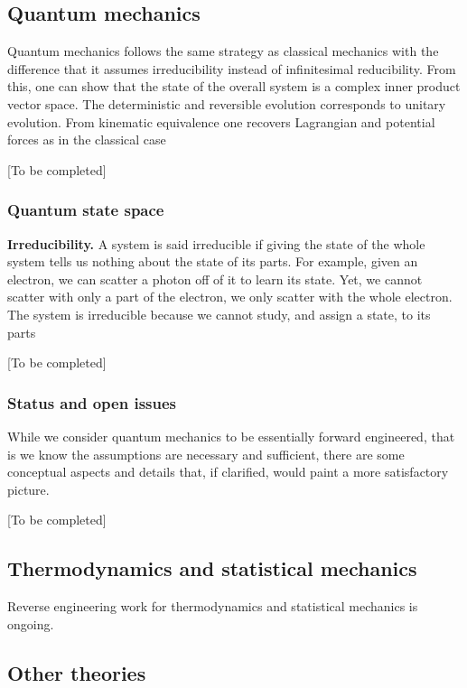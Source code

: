 \documentclass[twocolumn]{article}
\begin{document}
\subsection{Quantum mechanics}

Quantum mechanics follows the same strategy as classical mechanics with the difference that it assumes irreducibility instead of infinitesimal reducibility. From this, one can show that the state of the overall system is a complex inner product vector space. The deterministic and reversible evolution corresponds to unitary evolution. From kinematic equivalence one recovers Lagrangian and potential forces as in the classical case

[To be completed]

\subsubsection{Quantum state space}

\textbf{Irreducibility.} A system is said irreducible if giving the state of the whole system tells us nothing about the state of its parts. For example, given an electron, we can scatter a photon off of it to learn its state. Yet, we cannot scatter with only a part of the electron, we only scatter with the whole electron. The system is irreducible because we cannot study, and assign a state, to its parts

[To be completed]


\subsubsection{Status and open issues}

While we consider quantum mechanics to be essentially forward engineered, that is we know the assumptions are necessary and sufficient, there are some conceptual aspects and details that, if clarified, would paint a more satisfactory picture.

[To be completed]

\subsection{Thermodynamics and statistical mechanics}

Reverse engineering work for thermodynamics and statistical mechanics is ongoing.

\subsection{Other theories}
\end{document}

